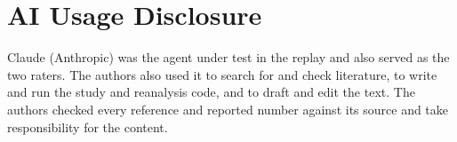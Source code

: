 \documentclass[pmlr]{jmlr}
\begin{document}
\section*{AI Usage Disclosure}
Claude (Anthropic) was the agent under test in the replay and also served as the two raters. The authors also used it to search for and check literature, to write and run the study and reanalysis code, and to draft and edit the text. The authors checked every reference and reported number against its source and take responsibility for the content.
\end{document}
